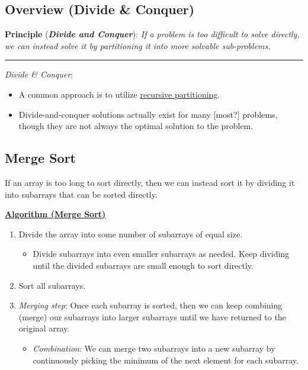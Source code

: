 \documentclass[12pt]{extarticle}
\theoremstyle{definition}
\theoremstyle{remark}
\newcommand{\probtitle}[1]{\noindent \textbf{\ul{#1}}}
\begin{document}
\subsection*{Overview (Divide \& Conquer)}
\begin{center}
\textbf{Principle} (\textbf{\textit{Divide and Conquer}}): \textit{If a problem is too difficult to solve directly, we can instead solve it by partitioning it into more solvable sub-problems. }

\vspace{10pt}
\rule{100mm}{0.4pt}
\end{center}

\noindent \textit{Divide \& Conquer}:
\begin{itemize}
    \item A common approach is to utilize \ul{recursive partitioning}.
    \item Divide-and-conquer solutions actually exist for many [most?] problems, though they are not always the optimal solution to the problem.
\end{itemize}

\subsection{Merge Sort}
If an array is too long to sort directly, then we can instead sort it by dividing it into subarrays that can be sorted directly.

\begin{tcolorbox}[colback=blue!50!red!13!white]
    \probtitle{Algorithm (Merge Sort)}
    \begin{enumerate}
        \item Divide the array into some number of subarrays of equal size. \begin{itemize}
            \item Divide subarrays into even smaller subarrays as needed. Keep dividing until the divided subarrays are small enough to sort directly. 
        \end{itemize}
        \item Sort all subarrays.
        \item \textit{Merging step}: Once each subarray is sorted, then we can keep combining (merge) our subarrays into larger subarrays until we have returned to the original array.\begin{itemize}
            \item \textit{Combination}: We can merge two subarrays into a new subarray by continuously picking the minimum of the next element for each subarray.
        \end{itemize}
    \end{enumerate}
\end{tcolorbox}
\end{document}
